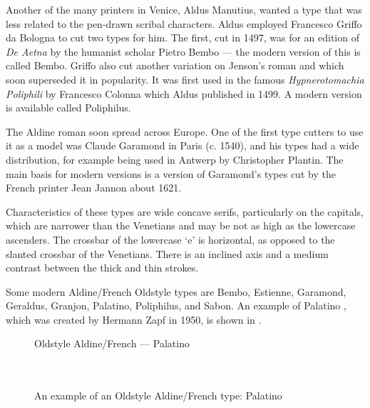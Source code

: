 \documentclass[10pt,a4paper,oneside,extrafontsizes]{memoir}%
\begin{document}
\begin{paracol}{2}
\switchEng
    Another of the many printers in Venice, 
Aldus Manutius, wanted a type
that was less related to the pen-drawn scribal characters. Aldus employed
Francesco Griffo da Bologna to cut two types
for him.  The first, cut in 1497, was for an edition of \emph{De Aetna} 
by the humanist scholar Pietro Bembo --- the modern
version of this is called Bembo. Griffo also cut another
variation on Jenson's roman and which soon superseded it 
in popularity.
It was first used in the famous \emph{Hypnerotomachia Poliphili} by
Francesco Colonna which Aldus published in 1499.
A modern version is available called Poliphilus.

The Aldine roman soon spread across Europe. One of the first type
cutters to use it as a model was Claude Garamond in Paris (c. 1540), and his types had a wide distribution,
for example being used in Antwerp by Christopher
Plantin. The main basis for modern
versions is a version of Garamond's types cut by the French printer
Jean Jannon about 1621.

    Characteristics of these types are wide concave serifs, particularly
on the capitals, which are narrower than the Venetians and may be not as high
as the lowercase ascenders. The crossbar of the lowercase `e' is horizontal, 
as opposed to the slanted crossbar of the Venetians. There is an inclined axis
and a medium contrast between the thick and thin strokes.

    Some modern Aldine/French Oldstyle types are 
Bembo, 
Estienne, 
Garamond, 
Geraldus, 
Granjon,
Palatino,  
Poliphilus, 
and Sabon.
An example of Palatino%
, 
which was created by Hermann Zapf
in 1950, is shown in .
\end{paracol}

\begin{figure}
\centering
{\centering{}\selectfont
  Oldstyle Aldine/French --- Palatino \\
  \UCalphabet \\
  \LCalphabet \\
  \fox\par}
\caption{An example of an Oldstyle Aldine/French type: Palatino} 
   \label{fig:palatino}
\end{figure}
\end{document}
